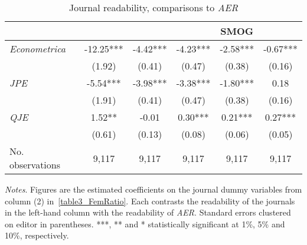 \begin{table}[H]
    \footnotesize
    \centering
    \begin{threeparttable}
        \caption{Journal readability, comparisons to \textit{AER}}
        \label{table3_journal}
        \begin{tabular}{p{3cm}S@{}S@{}S@{}S@{}S@{}}
            \toprule
            &{}&{}&{}&{SMOG}&{}\\
            \midrule
            \textit{Econometrica}         &      -12.25***&       -4.42***&       -4.23***&       -2.58***&       -0.67***\\
                                          &      (1.92)   &      (0.41)   &      (0.47)   &      (0.38)   &      (0.16)   \\
            \textit{JPE}                  &       -5.54***&       -3.98***&       -3.38***&       -1.80***&        0.18   \\
                                          &      (1.91)   &      (0.41)   &      (0.47)   &      (0.38)   &      (0.16)   \\
            \textit{QJE}                  &        1.52** &       -0.01   &        0.30***&        0.21***&        0.27***\\
                                          &      (0.61)   &      (0.13)   &      (0.08)   &      (0.06)   &      (0.05)   \\
            \midrule
            No. observations              &       9,117   &       9,117   &       9,117   &       9,117   &       9,117   \\
            \bottomrule
        \end{tabular}
        \begin{tablenotes}
            \tiny
            \item \textit{Notes}. Figures are the estimated coefficients on the journal dummy variables from column (2) in~\autoref{table3_FemRatio}. Each contrasts the readability of the journals in the left-hand column with the readability of \textit{AER}. Standard errors clustered on editor in parentheses. ***, ** and * statistically significant at 1\%, 5\% and 10\%, respectively.
        \end{tablenotes}
    \end{threeparttable}
\end{table}